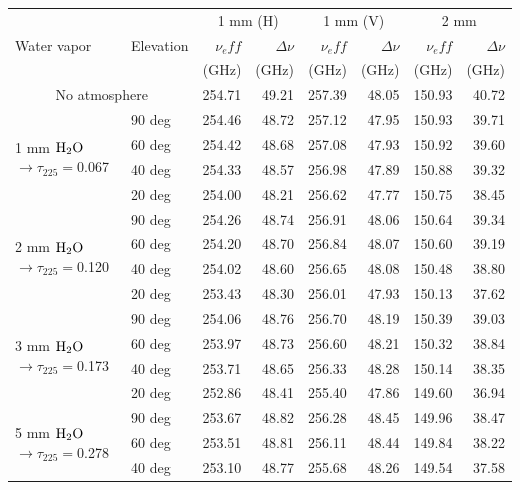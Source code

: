 \begin{table}[th]
\begin{center}
\begin{tabular}{|l|l|r|r|r|r|r|r|}
\hline 
\multirow{3}{*}{Water vapor} & \multirow{3}{*}{Elevation} & \multicolumn{2}{|c|}{1 mm (H)} & \multicolumn{2}{|c|}{1 mm (V)} &
\multicolumn{2}{|c|}{2 mm} \\
 & & $\nu_eff$ & $\Delta \nu$  & $\nu_eff$ & $\Delta \nu$  & $\nu_eff$ & $\Delta \nu$ \\
 & & (GHz) & (GHz)  & (GHz)  & (GHz)   & (GHz)  & (GHz)  \\
\hline
\multicolumn{2}{|c|}{No atmosphere} & 254.71 & 49.21 & 257.39 & 48.05 & 150.93 & 40.72 \\
\hline
\multirow{4}{*}{1 mm $\rm H_2O$ $\rightarrow \tau_{225}=$0.067} & 90 deg &  254.46 & 48.72 & 257.12 & 47.95 & 150.93 & 39.71 \\
 & 60 deg & 254.42 & 48.68 & 257.08 & 47.93 & 150.92 & 39.60 \\
 & 40 deg & 254.33 & 48.57 & 256.98 & 47.89 & 150.88 & 39.32 \\
 & 20 deg & 254.00 & 48.21 & 256.62 & 47.77 & 150.75 & 38.45 \\
\hline
\multirow{4}{*}{2 mm $\rm H_2O$ $\rightarrow \tau_{225}=$0.120} & 90 deg &  254.26 & 48.74 & 256.91 & 48.06 & 150.64 & 39.34 \\
 & 60 deg & 254.20 & 48.70 & 256.84 & 48.07 & 150.60 & 39.19 \\
 & 40 deg & 254.02 & 48.60 & 256.65 & 48.08 & 150.48 & 38.80 \\
 & 20 deg & 253.43 & 48.30 & 256.01 & 47.93 & 150.13 & 37.62 \\
\hline
\multirow{4}{*}{3 mm $\rm H_2O$ $\rightarrow \tau_{225}=$0.173} & 90 deg &  254.06 & 48.76 & 256.70 & 48.19 & 150.39 & 39.03 \\
 & 60 deg & 253.97 & 48.73 & 256.60 & 48.21 & 150.32 & 38.84 \\
 & 40 deg & 253.71 & 48.65 & 256.33 & 48.28 & 150.14 & 38.35 \\
 & 20 deg & 252.86 & 48.41 & 255.40 & 47.86 & 149.60 & 36.94 \\
\hline
\multirow{4}{*}{5 mm $\rm H_2O$ $\rightarrow \tau_{225}=$0.278} & 90 deg &  253.67 & 48.82 & 256.28 & 48.45 & 149.96 & 38.47 \\
 & 60 deg & 253.51 & 48.81 & 256.11 & 48.44 & 149.84 & 38.22 \\
 & 40 deg & 253.10 & 48.77 & 255.68 & 48.26 & 149.54 & 37.58 \\

\end{tabular}
\end{center}
\end{table}
